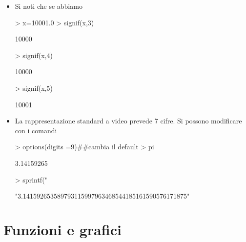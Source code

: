 \documentclass[onecolumn,11pt]{book}
\begin{document}
\begin{itemize}
\item
Si noti che se abbiamo
\begin{Schunk}
\begin{Sinput}
> x=10001.0
> signif(x,3)
\end{Sinput}
\begin{Soutput}
[1] 10000
\end{Soutput}
\begin{Sinput}
> signif(x,4)
\end{Sinput}
\begin{Soutput}
[1] 10000
\end{Soutput}
\begin{Sinput}
> signif(x,5)
\end{Sinput}
\begin{Soutput}
[1] 10001
\end{Soutput}
\end{Schunk}
\item
La rappresentazione standard a video prevede 7 cifre. Si possono modificare con i comandi
\begin{Schunk}
\begin{Sinput}
> options(digits =9)##cambia il default
> pi
\end{Sinput}
\begin{Soutput}
[1] 3.14159265
\end{Soutput}
\begin{Sinput}
> sprintf("%
\end{Sinput}
\begin{Soutput}
[1] "3.141592653589793115997963468544185161590576171875"
\end{Soutput}
\end{Schunk}
\end{itemize}
\section{Funzioni e grafici}
\end{document}
